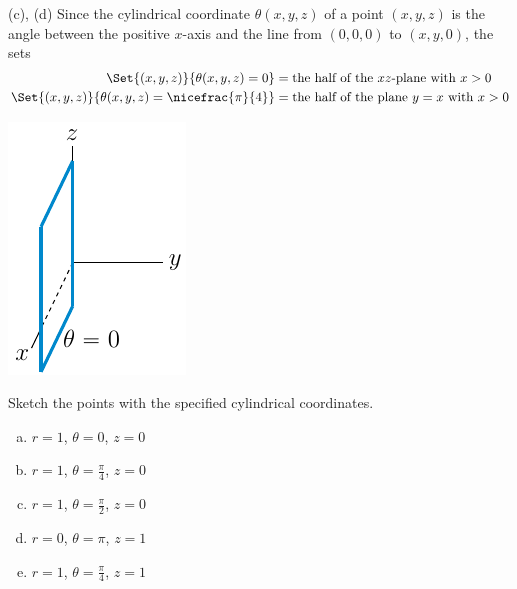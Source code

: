 \begin{solution}
(c), (d)
Since the cylindrical coordinate $\theta(x,y,z)$ of a point $(x,y,z)$ is
the angle between the positive $x$-axis and the line from $(0,0,0)$ 
to $(x,y,0)$, the sets
\begin{align*}
\Set{(x,y,z)}{\theta(x,y,z)=0}
&=\text{the half of the $xz$-plane with $x>0$} \\
\Set{(x,y,z)}{\theta(x,y,z)=\nicefrac{\pi}{4}}
&=\text{the half of the plane $y=x$ with $x>0$}
\end{align*} 
\begin{center}
   \includegraphics{fig/cylTh0.pdf}\qquad\qquad
\end{center}
\end{solution}


\begin{question}
Sketch the points with the specified cylindrical coordinates.
\begin{enumerate}[(a)]
\item
$r=1$, $\theta=0$, $z=0$
\item
$r=1$, $\theta=\frac{\pi}{4}$, $z=0$
\item
$r=1$, $\theta=\frac{\pi}{2}$, $z=0$
\item
$r=0$, $\theta=\pi$, $z=1$
\item
$r=1$, $\theta=\frac{\pi}{4}$, $z=1$
\end{enumerate}

\end{question}


